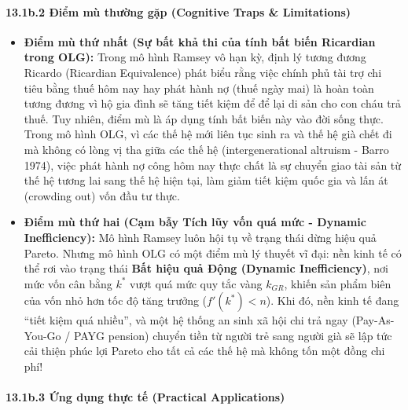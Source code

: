 \documentclass[
]{article}
\providecommand{\tightlist}{%
  \setlength{\itemsep}{0pt}\setlength{\parskip}{0pt}}
\begin{document}
\paragraph{13.1b.2 Điểm mù thường gặp (Cognitive Traps \&
Limitations)}\label{b.2-ux111iux1ec3m-muxf9-thux1b0ux1eddng-gux1eb7p-cognitive-traps-limitations}

\begin{itemize}
\tightlist
\item
  \textbf{Điểm mù thứ nhất (Sự bất khả thi của tính bất biến Ricardian
  trong OLG):} Trong mô hình Ramsey vô hạn kỳ, định lý tương đương
  Ricardo (Ricardian Equivalence) phát biểu rằng việc chính phủ tài trợ
  chi tiêu bằng thuế hôm nay hay phát hành nợ (thuế ngày mai) là hoàn
  toàn tương đương vì hộ gia đình sẽ tăng tiết kiệm để để lại di sản cho
  con cháu trả thuế. Tuy nhiên, điểm mù là áp dụng tính bất biến này vào
  đời sống thực. Trong mô hình OLG, vì các thế hệ mới liên tục sinh ra
  và thế hệ già chết đi mà không có lòng vị tha giữa các thế hệ
  (intergenerational altruism - Barro 1974), việc phát hành nợ công hôm
  nay thực chất là sự chuyển giao tài sản từ thế hệ tương lai sang thế
  hệ hiện tại, làm giảm tiết kiệm quốc gia và lấn át (crowding out) vốn
  đầu tư thực.
\item
  \textbf{Điểm mù thứ hai (Cạm bẫy Tích lũy vốn quá mức - Dynamic
  Inefficiency):} Mô hình Ramsey luôn hội tụ về trạng thái dừng hiệu quả
  Pareto. Nhưng mô hình OLG có một điểm mù lý thuyết vĩ đại: nền kinh tế
  có thể rơi vào trạng thái \textbf{Bất hiệu quả Động (Dynamic
  Inefficiency)}, nơi mức vốn cân bằng \(k^*\) vượt quá mức quy tắc vàng
  \(k_{GR}\), khiến sản phẩm biên của vốn nhỏ hơn tốc độ tăng trưởng
  (\(f'(k^*) < n\)). Khi đó, nền kinh tế đang ``tiết kiệm quá nhiều'',
  và một hệ thống an sinh xã hội chi trả ngay (Pay-As-You-Go / PAYG
  pension) chuyển tiền từ người trẻ sang người già sẽ lập tức cải thiện
  phúc lợi Pareto cho tất cả các thế hệ mà không tốn một đồng chi phí!
\end{itemize}

\paragraph{13.1b.3 Ứng dụng thực tế (Practical
Applications)}\label{b.3-ux1ee9ng-dux1ee5ng-thux1ef1c-tux1ebf-practical-applications}
\end{document}
